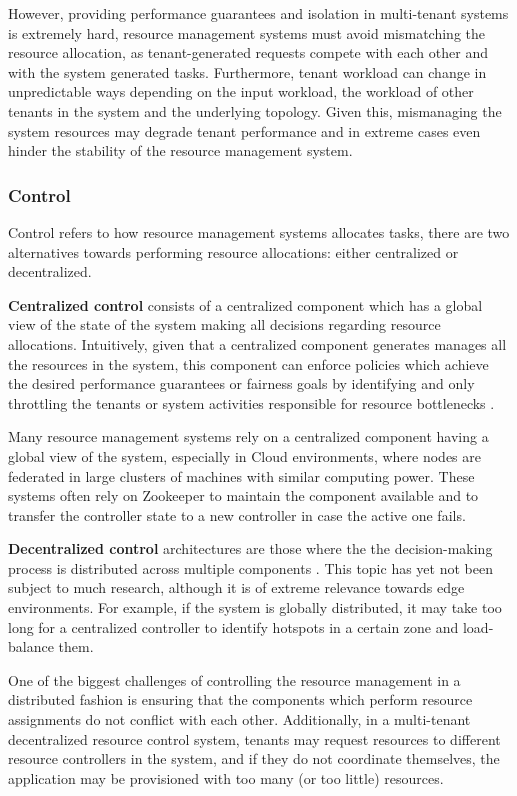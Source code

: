 However, providing performance guarantees and isolation in multi-tenant systems is extremely hard, resource management systems must avoid mismatching the resource allocation, as tenant-generated requests compete with each other and with the system generated tasks. Furthermore, tenant workload can change in unpredictable ways depending on the input workload, the workload of other tenants in the system and the underlying topology. Given this, mismanaging the system resources may degrade tenant performance and in extreme cases even hinder the stability of the resource management system.

\subsubsection{Control}

Control refers to how resource management systems allocates tasks, there are two alternatives towards performing resource allocations: either centralized or decentralized.

\textbf{Centralized control} consists of a centralized component which has a global view of the state of the system making all decisions regarding resource allocations. Intuitively, given that a centralized component generates manages all the resources in the system, this component can enforce policies which achieve the desired performance guarantees or fairness goals by identifying and only throttling the tenants or system activities responsible for resource bottlenecks \cite{verma2015large}.

Many resource management systems rely on a centralized component having a global view of the system, especially in Cloud environments, where nodes are federated in large clusters of machines with similar computing power. These systems often rely on Zookeeper \cite{hunt2010zookeeper} to maintain the component available and to transfer the controller state to a new controller in case the active one fails.

\textbf{Decentralized control} architectures are those where the the decision-making process is distributed across multiple components \cite{Hong2019}. This topic has yet not been subject to much research, although it is of extreme relevance towards edge environments. For example, if the system is globally distributed, it may take too long for a centralized controller to identify hotspots in a certain zone and load-balance them.

One of the biggest challenges of controlling the resource management in a distributed fashion is ensuring that the components which perform resource assignments do not conflict with each other. Additionally, in a multi-tenant decentralized resource control system, tenants may request resources to different resource controllers in the system, and if they do not coordinate themselves, the application may be provisioned with too many (or too little) resources.

